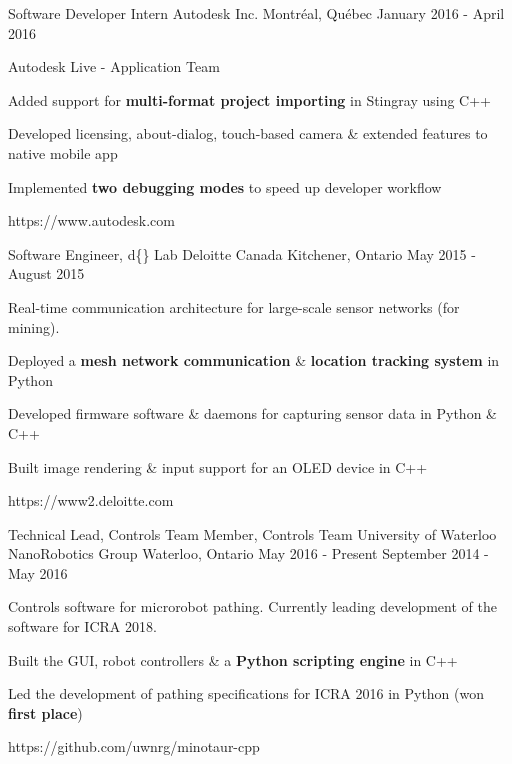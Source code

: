 \begin{cventries}

\cventrylink
{Software Developer Intern}
{Autodesk Inc.}
{Montréal, Québec}
{January 2016 - April 2016}
{ %
Autodesk Live - Application Team
\begin{cvitems}
\item[]
\item {Added support for \textbf{multi-format project importing} in Stingray using C++}
\item {Developed licensing, about-dialog, touch-based camera \& extended features to native mobile app}
\item {Implemented \textbf{two debugging modes} to speed up developer workflow}
\end{cvitems}
}
{https://www.autodesk.com}


\cventrylink
{Software Engineer, d\{\} Lab}
{Deloitte Canada} %
{Kitchener, Ontario} %
{May 2015 - August 2015} %
{
Real-time communication architecture for large-scale sensor networks (for mining).
\begin{cvitems}
\item[]
\item {Deployed a \textbf{mesh network communication} \& \textbf{location tracking system} in Python}
\item {Developed firmware software \& daemons for capturing sensor data in Python \& C++}
\item {Built image rendering \& input support for an OLED device in C++}
\end{cvitems}
}
{https://www2.deloitte.com}


\cventrylink
{Technical Lead, Controls Team \newline {\vspace{-.75mm}}
Member, Controls Team}
{University of Waterloo NanoRobotics Group}
{Waterloo, Ontario}
{May 2016 - Present \newline {\vspace{-1mm}}
September 2014 - May 2016} %
{ %
Controls software for microrobot pathing. Currently leading development of the software for ICRA 2018.
\begin{cvitems}
\item[]
\item {Built the GUI, robot controllers \& a \textbf{Python scripting engine} in C++}
\item {Led the development of pathing specifications for ICRA 2016 in Python (won \textbf{first place})}
\end{cvitems}
}
{https://github.com/uwnrg/minotaur-cpp}

\end{cventries}
